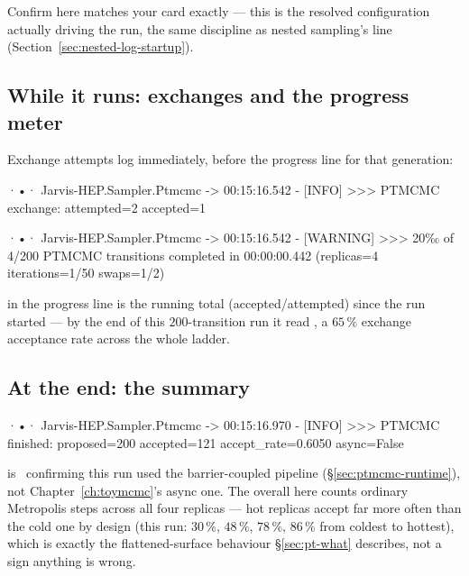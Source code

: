 Confirm  here matches your card exactly --- this is the resolved
configuration actually driving the run, the same discipline as nested sampling's
 line (Section~\ref{sec:nested-log-startup}).

\subsection{While it runs: exchanges and the progress meter}
\label{sec:ptmcmc-log-progress}

Exchange attempts log immediately, before the progress line for that generation:

\begin{terminal}
\begin{jout}
·•· Jarvis-HEP.Sampler.Ptmcmc
	-> 00:15:16.542 - [INFO] >>>
PTMCMC exchange: attempted=2 accepted=1

·•· Jarvis-HEP.Sampler.Ptmcmc
	-> 00:15:16.542 - [WARNING] >>>
20‰ of 4/200 PTMCMC transitions completed in 00:00:00.442
(replicas=4 iterations=1/50 swaps=1/2)
\end{jout}
\end{terminal}

 in the progress line is the running total (accepted/attempted) since
the run started --- by the end of this $200$-transition run it read
, a $65\,\%$ exchange acceptance rate across the whole ladder.

\subsection{At the end: the summary}
\label{sec:ptmcmc-log-summary}

\begin{terminal}
\begin{jout}
·•· Jarvis-HEP.Sampler.Ptmcmc
	-> 00:15:16.970 - [INFO] >>>
PTMCMC finished: proposed=200 accepted=121 accept_rate=0.6050 async=False
\end{jout}
\end{terminal}

 is \Jtwo\ confirming this run used the barrier-coupled pipeline
(\S\ref{sec:ptmcmc-runtime}), not Chapter~\ref{ch:toymcmc}'s async one. The overall
 here counts ordinary Metropolis steps across all four
replicas --- hot replicas accept far more often than the cold one by design (this run:
$30\,\%$, $48\,\%$, $78\,\%$, $86\,\%$ from coldest to hottest), which is exactly the
flattened-surface behaviour \S\ref{sec:pt-what} describes, not a sign anything is
wrong.

